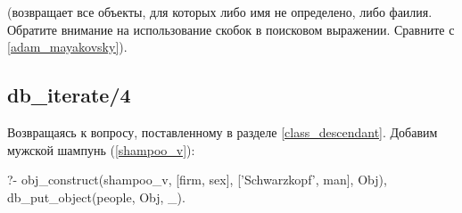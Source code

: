 \documentclass[a4paper]{book}
\begin{document}
(возвращает все объекты, для которых либо имя не определено, либо
фаилия. Обратите внимание на использование скобок в поисковом
выражении. Сравните с \ref{adam_mayakovsky}).

\subsection{db_iterate/4}

Возвращаясь к вопросу, поставленному в разделе
\ref{class_descendant}. Добавим мужской шампунь (\ref{shampoo_v}):

\begin{example}{}{}
?- obj_construct(shampoo_v, [firm, sex], 
                 ['Schwarzkopf', man], Obj),
    db_put_object(people, Obj, _).
\end{example}
\end{document}
